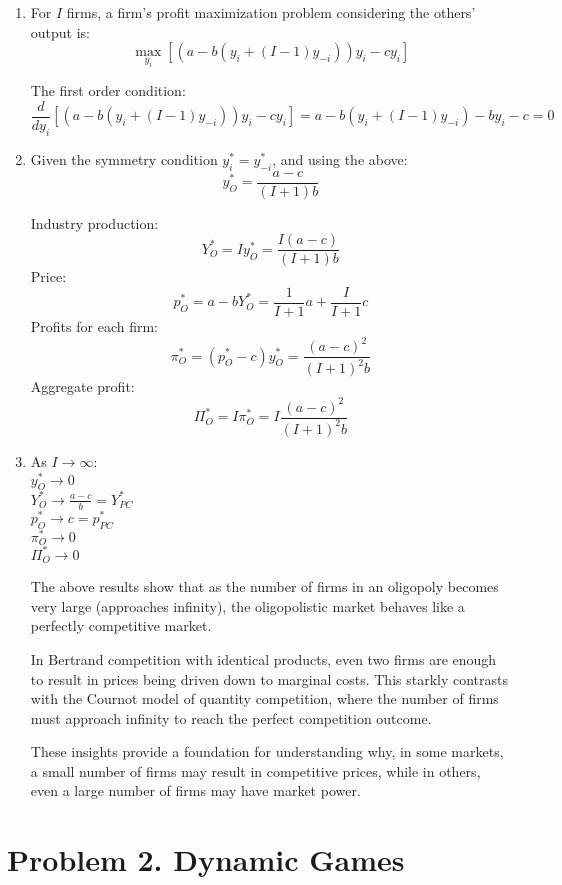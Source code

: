\documentclass[UTF8,titlepage]{article}
\numberwithin{figure}{section}
\begin{document}
\begin{enumerate}
\item For \(I\) firms, a firm's profit maximization problem considering the others' output is:
\[ \max_{y_i} \left[ (a - b(y_i + (I-1)y_{-i}))y_i - c y_i \right] \]

The first order condition:
\[ \frac{d}{dy_i} [(a - b(y_i + (I-1)y_{-i}))y_i - c y_i] = a - b(y_i + (I-1)y_{-i}) - by_i - c = 0 \]

\item Given the symmetry condition \(y_i^* = y_{-i}^*\), and using the above:
\[ y_O^* = \frac{a - c}{(I+1)b} \]

Industry production:
\[ Y_O^* = I y_O^* = \frac{I(a - c)}{(I+1)b} \]
Price:
\[ p_O^* = a - b Y_O^* = \frac{1}{I+1} a+\frac{I}{I+1} c\]
Profits for each firm:
\[ \pi_{O}^* = (p_O^* - c) y_O^* = \frac{(a-c)^{2}}{(I+1)^{2} b} \]
Aggregate profit:
\[ \Pi_O^* = I \pi_{O}^* = I \frac{(a-c)^{2}}{(I+1)^{2} b}\]

\item As \(I \to \infty\):\\
\( y_O^* \to 0 \)\\ 
\( Y_O^* \to \frac{a - c}{b} = Y_{PC}^* \)\\
\( p_O^* \to c = p_{PC}^* \)\\
\( \pi_O^* \to 0 \)\\
\( \Pi_O^* \to 0 \)

The above results show that as the number of firms in an oligopoly becomes very large (approaches infinity), the oligopolistic market behaves like a perfectly competitive market.

In Bertrand competition with identical products, even two firms are enough to result in prices being driven down to marginal costs. This starkly contrasts with the Cournot model of quantity competition, where the number of firms must approach infinity to reach the perfect competition outcome.

These insights provide a foundation for understanding why, in some markets, a small number of firms may result in competitive prices, while in others, even a large number of firms may have market power.
\end{enumerate}

\section{Problem 2. Dynamic Games}
\end{document}
